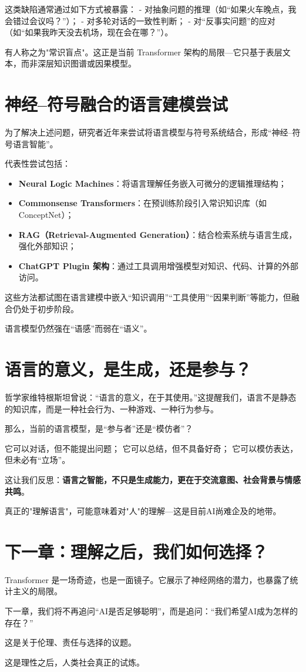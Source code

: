 这类缺陷通常通过如下方式被暴露：
- 对抽象问题的推理（如“如果火车晚点，我会错过会议吗？”）；
- 对多轮对话的一致性判断；
- 对“反事实问题”的应对（如“如果我昨天没去机场，现在会在哪？”）。

有人称之为"常识盲点"。这正是当前 Transformer 架构的局限---它只基于表层文本，而非深层知识图谱或因果模型。

\section*{神经–符号融合的语言建模尝试}

为了解决上述问题，研究者近年来尝试将语言模型与符号系统结合，形成“神经–符号语言智能”。

代表性尝试包括：

\begin{itemize}
\item \textbf{Neural Logic Machines}：将语言理解任务嵌入可微分的逻辑推理结构；
\item \textbf{Commonsense Transformers}：在预训练阶段引入常识知识库（如 ConceptNet）；
\item \textbf{RAG（Retrieval-Augmented Generation）}：结合检索系统与语言生成，强化外部知识；
\item \textbf{ChatGPT Plugin 架构}：通过工具调用增强模型对知识、代码、计算的外部访问。
\end{itemize}

这些方法都试图在语言建模中嵌入“知识调用”“工具使用”“因果判断”等能力，但融合仍处于初步阶段。

语言模型仍然强在“语感”而弱在“语义”。

\section*{语言的意义，是生成，还是参与？}

哲学家维特根斯坦曾说：“语言的意义，在于其使用。”这提醒我们，语言不是静态的知识库，而是一种社会行为、一种游戏、一种行为参与。

那么，当前的语言模型，是“参与者”还是“模仿者”？

它可以对话，但不能提出问题；
它可以总结，但不具备好奇；
它可以模仿表达，但未必有“立场”。

这让我们反思：\textbf{语言之智能，不只是生成能力，更在于交流意图、社会背景与情感共鸣}。

真正的"理解语言"，可能意味着对"人"的理解---这是目前AI尚难企及的地带。

\section*{下一章：理解之后，我们如何选择？}

Transformer 是一场奇迹，也是一面镜子。它展示了神经网络的潜力，也暴露了统计主义的局限。

下一章，我们将不再追问“AI是否足够聪明”，而是追问：“我们希望AI成为怎样的存在？”

这是关于伦理、责任与选择的议题。

这是理性之后，人类社会真正的试炼。

\nocite{*}
\printbibliography[heading=bibintoc, title=\ebibname]


\newpage



